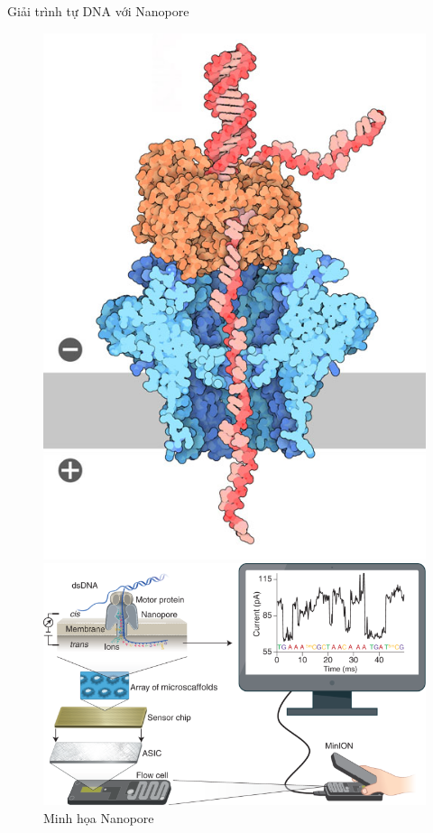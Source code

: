 \documentclass[10pt]{beamer}
\theoremstyle{remark}
\numberwithin{algocf}{section}
\numberwithin{equation}{section}
\numberwithin{dl}{section}
\numberwithin{figure}{section}
\begin{document}
\begin{frame}{Giải trình tự DNA với Nanopore}
    \begin{figure}
        \centering
        \begin{minipage}{.45\textwidth}
        \centering
        \includegraphics[width=.75\linewidth]{figures/nanopore_1.jpg}
        \end{minipage}
        \begin{minipage}{.45\textwidth}
        \centering
        \includegraphics[width=.75\linewidth]{figures/nanopore_2.png}
        \end{minipage}
        \caption{Minh họa Nanopore}
    \end{figure}
\end{frame}
\end{document}
